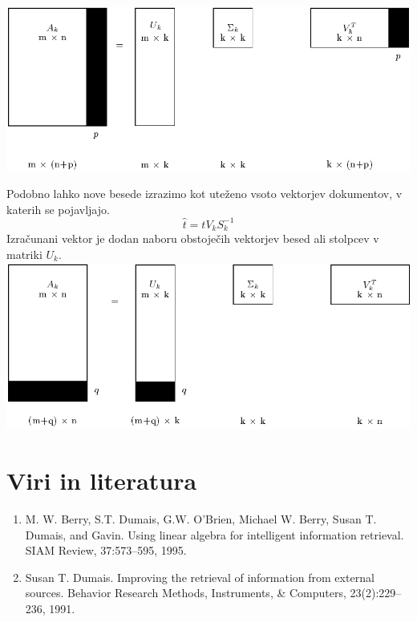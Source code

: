 \documentclass{article}
\begin{document}
\includegraphics[scale=0.5]{assets/zaDokumente.png}
\\
\par Podobno lahko nove besede izrazimo kot uteženo vsoto vektorjev dokumentov, v katerih se pojavljajo.
\[ \hat{t} = tV_kS^{-1}_k\]
Izračunani vektor je dodan naboru obstoječih vektorjev besed ali stolpcev v matriki $U_k$. \\

\includegraphics[scale=0.5]{assets/zaTermine.png}

\section{Viri in literatura}
\begin{enumerate}
    \item  M. W. Berry, S.T. Dumais, G.W. O’Brien, Michael W. Berry, Susan T.
    Dumais, and Gavin. Using linear algebra for intelligent information retrieval.
    SIAM Review, 37:573–595, 1995.
    \item Susan T. Dumais. Improving the retrieval of information from external 
    sources. Behavior Research Methods, Instruments, \& Computers, 23(2):229–
    236, 1991.
\end{enumerate}
\end{document}
